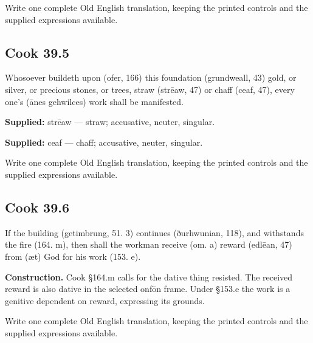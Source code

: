 Write one complete Old English translation, keeping the printed controls and the supplied expressions available.

\par\begin{minipage}{\linewidth}\raggedright
\subsection*{Cook 39.5}

Whosoever buildeth upon (ofer, 166) this foundation (grundweall, 43) gold, or silver, or precious stones, or trees, straw (strēaw, 47) or chaff (ceaf, 47), every one’s (ānes gehwilces) work shall be manifested.

\end{minipage}\par\addvspace{4pt}

\textbf{Supplied:} strēaw — straw; accusative, neuter, singular.

\textbf{Supplied:} ceaf — chaff; accusative, neuter, singular.

Write one complete Old English translation, keeping the printed controls and the supplied expressions available.

\par\begin{minipage}{\linewidth}\raggedright
\subsection*{Cook 39.6}

If the building (getimbrung, 51. 3) continues (ðurhwunian, 118), and withstands the fire (164. m), then shall the workman receive (om. a) reward (edlēan, 47) from (æt) God for his work (153. e).

\textbf{Construction.} Cook §164.m calls for the dative thing resisted. The received reward is also dative in the selected onfōn frame. Under §153.e the work is a genitive dependent on reward, expressing its grounds.

Write one complete Old English translation, keeping the printed controls and the supplied expressions available.

\end{minipage}\par\addvspace{4pt}

